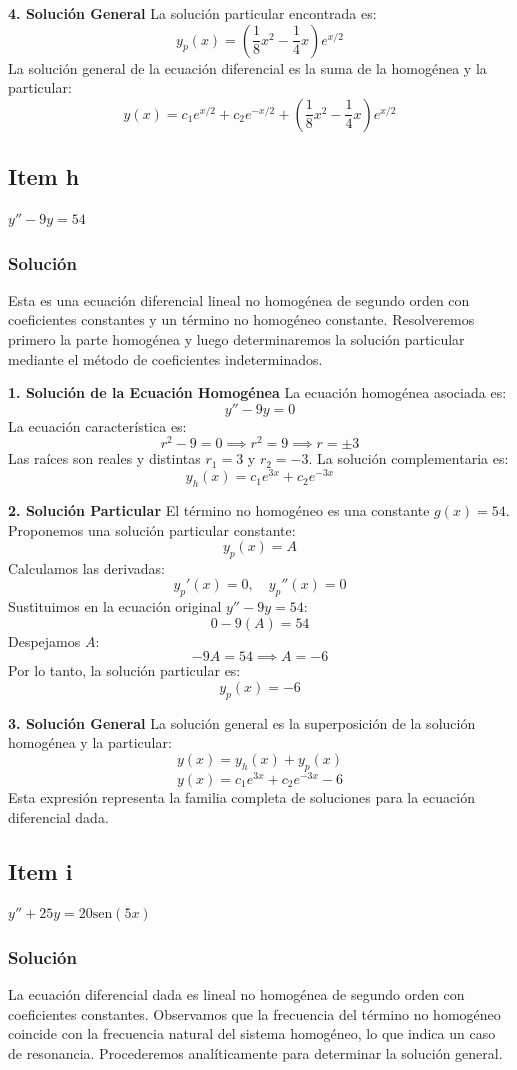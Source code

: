 \documentclass[a4paper]{article}
\begin{document}
\textbf{4. Solución General}
La solución particular encontrada es:
$$
y_p(x) = \left( \frac{1}{8}x^2 - \frac{1}{4}x \right) e^{x/2}
$$
La solución general de la ecuación diferencial es la suma de la homogénea y la particular:
$$
y(x) = c_1 e^{x/2} + c_2 e^{-x/2} + \left( \frac{1}{8}x^2 - \frac{1}{4}x \right) e^{x/2}
$$

\subsection{Item h}
$y'' - 9y = 54$

\subsubsection{Solución}
Esta es una ecuación diferencial lineal no homogénea de segundo orden con coeficientes constantes y un término no homogéneo constante. Resolveremos primero la parte homogénea y luego determinaremos la solución particular mediante el método de coeficientes indeterminados.

\textbf{1. Solución de la Ecuación Homogénea}
La ecuación homogénea asociada es:
$$
y'' - 9y = 0
$$
La ecuación característica es:
$$
r^2 - 9 = 0 \implies r^2 = 9 \implies r = \pm 3
$$
Las raíces son reales y distintas $r_1 = 3$ y $r_2 = -3$. La solución complementaria es:
$$
y_h(x) = c_1 e^{3x} + c_2 e^{-3x}
$$

\textbf{2. Solución Particular}
El término no homogéneo es una constante $g(x) = 54$. Proponemos una solución particular constante:
$$
y_p(x) = A
$$
Calculamos las derivadas:
$$
y_p'(x) = 0, \quad y_p''(x) = 0
$$
Sustituimos en la ecuación original $y'' - 9y = 54$:
$$
0 - 9(A) = 54
$$
Despejamos $A$:
$$
-9A = 54 \implies A = -6
$$
Por lo tanto, la solución particular es:
$$
y_p(x) = -6
$$

\textbf{3. Solución General}
La solución general es la superposición de la solución homogénea y la particular:
$$
y(x) = y_h(x) + y_p(x)
$$
$$
y(x) = c_1 e^{3x} + c_2 e^{-3x} - 6
$$
Esta expresión representa la familia completa de soluciones para la ecuación diferencial dada.

\subsection{Item i}
$y'' + 25y = 20\text{sen}(5x)$

\subsubsection{Solución}
La ecuación diferencial dada es lineal no homogénea de segundo orden con coeficientes constantes. Observamos que la frecuencia del término no homogéneo coincide con la frecuencia natural del sistema homogéneo, lo que indica un caso de resonancia. Procederemos analíticamente para determinar la solución general.
\end{document}
